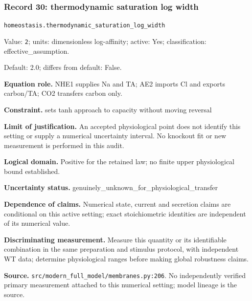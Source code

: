 \subsubsection*{Record 30: thermodynamic saturation log width}
{\small \nolinkurl{homeostasis.thermodynamic_saturation_log_width}\par

Value: \texttt{2}; units: dimensionless log-affinity; active: Yes; classification: effective\_assumption.\par

Default: 2.0; differs from default: False.\par

\textbf{Equation role.} NHE1 supplies Na and TA; AE2 imports Cl and exports carbon/TA; CO2 transfers carbon only.\par

\textbf{Constraint.} sets tanh approach to capacity without moving reversal\par

\textbf{Limit of justification.} An accepted physiological point does not identify this setting or supply a numerical uncertainty interval. No knockout fit or new measurement is performed in this audit.\par

\textbf{Logical domain.} Positive for the retained law; no finite upper physiological bound established.\par

\textbf{Uncertainty status.} genuinely\_unknown\_for\_physiological\_transfer\par

\textbf{Dependence of claims.} Numerical state, current and secretion claims are conditional on this active setting; exact stoichiometric identities are independent of its numerical value.\par

\textbf{Discriminating measurement.} Measure this quantity or its identifiable combination in the same preparation and stimulus protocol, with independent WT data; determine physiological ranges before making global robustness claims.\par

\textbf{Source.} \nolinkurl{src/modern_full_model/membranes.py:206}. No independently verified primary measurement attached to this numerical setting; model lineage is the source.\par}

